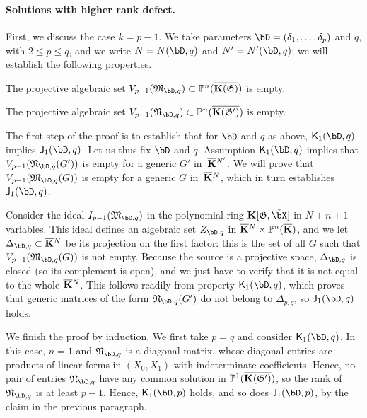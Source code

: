 \documentclass[12pt]{article}
\begin{document}
\paragraph{Solutions with higher rank defect.} 
First, we discuss the case $k=p-1$.  We take parameters
$\bD=(\delta_1,\dots,\delta_p)$ and $q$, with $2 \le p \le q$, and we write
$N=N(\bD,q)$ and $N'=N'(\bD,q)$; we will establish the following
properties.
\begin{description}[leftmargin=*]
\item[$\assI_1(\bD,q).$] The projective algebraic set  $V_{p-1}(\mathfrak{M}_{\bD,q})\subset\P^n(\KKGbar)$
  is empty.
\item[$\assJ_1(\bD,q).$] The projective algebraic set 
 $V_{p-1}(\mathfrak{N}_{\bD,q})\subset\P^n(\KKGpbar)$ is empty.
\end{description}
The first step of the proof is to establish that for $\bD$ and $q$ as above,
$\assJ_1(\bD,q)$ implies $\assI_1(\bD,q)$. Let us thus fix $\bD$
and $q$.  Assumption $\assJ_1(\bD,q)$ implies that
$V_{p-1}(\mathfrak{N}_{\bD,q}(G'))$ is empty for a generic $G'$
in~$\overline{\mathbf{K}}{}^{N'}$.  We will prove that
$V_{p-1}(\mathfrak{M}_{\bD,q}(G))$ is empty for a generic $G$
in~$\overline{\mathbf{K}}{}^N$, which in turn establishes $\assI_1(\bD,q)$.

Consider the ideal $I_{p-1}(\mathfrak{M}_{\bD,q})$ in the polynomial
ring $\KK[\mathfrak{G},\tilde\bX]$ in $N+n+1$ variables. This ideal
defines an algebraic set $Z_{\bD,q}$ in $\overline{\mathbf{K}}{}^N \times
\mathbb{P}^n(\overline{\mathbf{K}})$, and we let $\Delta_{\bD,q} \subset \KKbar{}^N$ be its
projection on the first factor: this is the set of all $G$ such that
$V_{p-1}(\mathfrak{M}_{\bD,q}(G))$ is not empty. Because the source is
a projective space, $\Delta_{\bD,q}$ is closed (so its complement is
open), and we just have to verify that it is not equal to the whole
$\overline{\mathbf{K}}{}^N$. This follows readily from property $\assJ_1(\bD,q)$,
which proves that generic matrices of the form
$\mathfrak{N}_{\bD,q}(G')$ do not belong to $\Delta_{p,q}$, so 
$\assI_1(\bD,q)$ holds.

We finish the proof by induction. We first take $p=q$ and consider
$\assJ_1(\bD,q)$.  In this case, $n=1$ and $\mathfrak{N}_{\bD,q}$ is
a diagonal matrix, whose diagonal entries are products of linear forms
in $(X_0,X_1)$ with indeterminate coefficients. Hence, no pair of
entries $\mathfrak{N}_{\bD,q}$ have any common solution in
$\mathbb{P}^1(\overline{\mathbf{K}(\mathfrak{G}')})$, so the rank of $\mathfrak{N}_{\bD,q}$ is at least
$p-1$. Hence, $\assJ_1(\bD,p)$ holds, and so does $\assI_1(\bD,p)$, by the claim in the previous paragraph.
\end{document}

